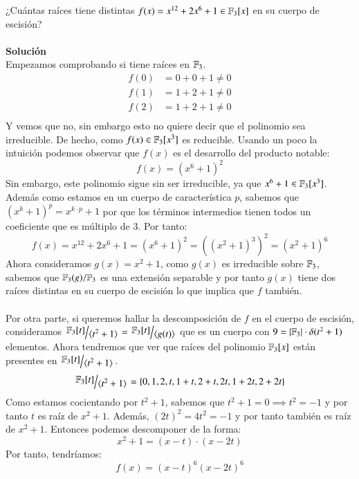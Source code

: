 \begin{ex}[H3.15]
    ¿Cuántas raíces tiene distintas $f(x) = x^{12} + 2x^6 + 1 \in \mathbb{F}_3[x]$ en su cuerpo de escisión?\\\\
    \textbf{Solución}\\
    Empezamos comprobando si tiene raíces en $\mathbb{F}_3$.
    \begin{align*}
        f(0) &= 0 + 0 + 1 \neq 0\\
        f(1) &= 1 + 2 + 1 \neq 0\\
        f(2) &= 1 + 2 + 1 \neq 0\\
    \end{align*}
    Y vemos que no, sin embargo esto no quiere decir que el polinomio sea irreducible. De hecho, como $f(x) \in \mathbb{F}_3[x^3]$ es reducible. Usando un poco la intuición podemos observar que $f(x)$ es el desarrollo del producto notable:
    $$
        f(x) = (x^6 + 1)^2
    $$
    Sin embargo, este polinomio sigue sin ser irreducible, ya que $x^6 + 1 \in \mathbb{F}_3[x^3]$. Además como estamos en un cuerpo de característica $p$, sabemos que $(x^k + 1)^p = x^{k\cdot p} + 1$ por que los términos intermedios tienen todos un coeficiente que es múltiplo de $3$. Por tanto:
    $$
        f(x) = x^{12} + 2x^6 + 1 = (x^6+1)^2 = ((x^2+1)^3)^2 = (x^2+1)^6
    $$
    Ahora consideramos $g(x) = x^2 + 1$, como $g(x)$ es irreducible sobre $\mathbb{F}_3$, sabemos que $\mathbb{F}_3(g)/\mathbb{F}_3$ es una extensión separable y por tanto $g(x)$ tiene dos raíces distintas en su cuerpo de escisión lo que implica que $f$ también.\\\\
    Por otra parte, si queremos hallar la descomposición de $f$ en el cuerpo de escisión, consideramos $\quo{\F_3[t]}{\gen{t^2+1}} = \quo{\F_3[t]}{\gen{g(t)}}$ que es un cuerpo con $9 = \left|\mathbb{F}_3\right| \cdot \delta(t^2+1)$ elementos. Ahora tendremos que ver que raíces del polinomio $\mathbb{F}_3[x]$ están presentes en $\quo{\F_3[t]}{\gen{t^2+1}}$.\\
    $$
        \quo{\F_3[t]}{\gen{t^2+1}} = \sdf{0, 1, 2, t, 1+t, 2+t, 2t, 1+2t, 2+2t}
    $$
    Como estamos cocientando por $t^2+1$, sabemos que $t^2+1 = 0 \implies t^2 = -1$ y por tanto $t$ es raíz de $x^2+1$. Además, $(2t)^2 = 4t^2 = -1$ y por tanto también es raíz de $x^2+1$. Entonces podemos descomponer de la forma:
    $$
        x^2 + 1 = (x-t)\cdot(x-2t)
    $$
    Por tanto, tendríamos:
    $$
        f(x) = (x-t)^6(x-2t)^6
    $$
\end{ex}
